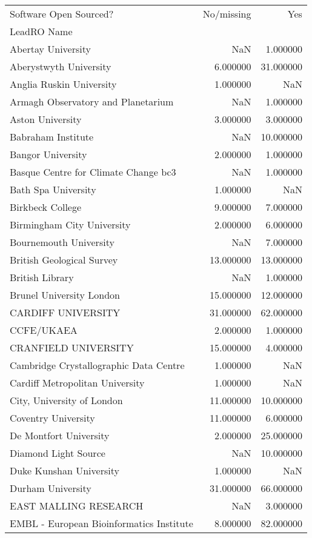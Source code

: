 \begin{tabular}{lrr}
\toprule
Software Open Sourced? & No/missing & Yes \\
LeadRO Name &  &  \\
\midrule
Abertay University & NaN & 1.000000 \\
Aberystwyth University & 6.000000 & 31.000000 \\
Anglia Ruskin University & 1.000000 & NaN \\
Armagh Observatory and Planetarium & NaN & 1.000000 \\
Aston University & 3.000000 & 3.000000 \\
Babraham Institute & NaN & 10.000000 \\
Bangor University & 2.000000 & 1.000000 \\
Basque Centre for Climate Change bc3 & NaN & 1.000000 \\
Bath Spa University & 1.000000 & NaN \\
Birkbeck College & 9.000000 & 7.000000 \\
Birmingham City University & 2.000000 & 6.000000 \\
Bournemouth University & NaN & 7.000000 \\
British Geological Survey & 13.000000 & 13.000000 \\
British Library & NaN & 1.000000 \\
Brunel University London & 15.000000 & 12.000000 \\
CARDIFF UNIVERSITY & 31.000000 & 62.000000 \\
CCFE/UKAEA & 2.000000 & 1.000000 \\
CRANFIELD UNIVERSITY & 15.000000 & 4.000000 \\
Cambridge Crystallographic Data Centre & 1.000000 & NaN \\
Cardiff Metropolitan University & 1.000000 & NaN \\
City, University of London & 11.000000 & 10.000000 \\
Coventry University & 11.000000 & 6.000000 \\
De Montfort University & 2.000000 & 25.000000 \\
Diamond Light Source & NaN & 10.000000 \\
Duke Kunshan University & 1.000000 & NaN \\
Durham University & 31.000000 & 66.000000 \\
EAST MALLING RESEARCH & NaN & 3.000000 \\
EMBL - European Bioinformatics Institute & 8.000000 & 82.000000 \\

\end{tabular}

